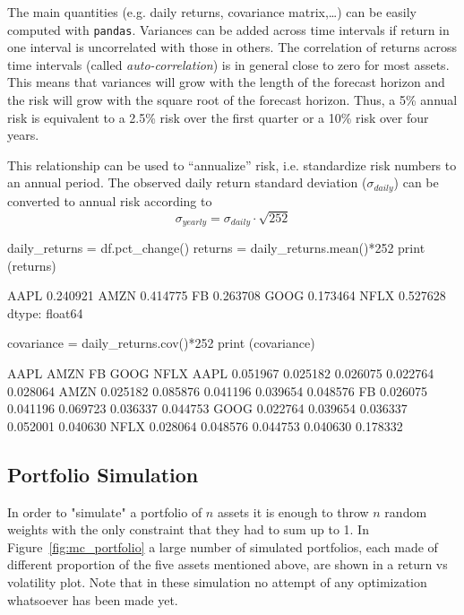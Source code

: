 The main quantities (e.g. daily returns, covariance matrix,\ldots) can be easily computed with \texttt{pandas}.
Variances can be added across time intervals if return in one interval is uncorrelated with those in others. The correlation of returns across time intervals (called \emph{auto-correlation}) is in general close to zero for most assets. This means that variances will grow with the length of the forecast horizon and the risk will grow with the square root of the forecast horizon. 
Thus, a 5\% annual risk is equivalent to a 2.5\% risk over the first quarter or a 10\% risk over four years. 

This relationship can be used to “annualize” risk, i.e. standardize risk numbers to an annual period. The observed daily return standard deviation ($\sigma_{daily}$) can be converted to annual risk according to
\begin{equation}
\sigma_{yearly} = \sigma_{daily}\cdot\sqrt{252}
\end{equation}

\begin{ipython}
daily_returns = df.pct_change()
returns = daily_returns.mean()*252
print (returns)
\end{ipython}
\begin{ioutput}
AAPL    0.240921
AMZN    0.414775
FB      0.263708
GOOG    0.173464
NFLX    0.527628
dtype: float64
\end{ioutput}

\begin{ipython}
covariance = daily_returns.cov()*252
print (covariance)
\end{ipython}
\begin{ioutput}
          AAPL      AMZN        FB      GOOG      NFLX
AAPL  0.051967  0.025182  0.026075  0.022764  0.028064
AMZN  0.025182  0.085876  0.041196  0.039654  0.048576
FB    0.026075  0.041196  0.069723  0.036337  0.044753
GOOG  0.022764  0.039654  0.036337  0.052001  0.040630
NFLX  0.028064  0.048576  0.044753  0.040630  0.178332
\end{ioutput}
    
\subsection{Portfolio Simulation}
In order to "simulate" a portfolio of $n$ assets it is enough to throw $n$ random weights with the only constraint that they had to sum up to 1. 
In Figure~\ref{fig:mc_portfolio} a large number of simulated portfolios, each made of different proportion of the five assets mentioned above, are shown in a return vs volatility plot. 
Note that in these simulation no attempt of any optimization whatsoever has been made yet.

